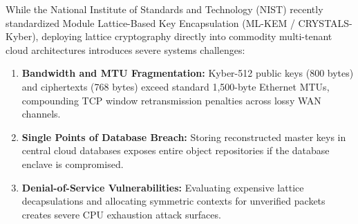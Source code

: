 \documentclass[11pt,a4paper]{article}
\begin{document}
While the National Institute of Standards and Technology (NIST) recently standardized Module Lattice-Based Key Encapsulation (ML-KEM / CRYSTALS-Kyber), deploying lattice cryptography directly into commodity multi-tenant cloud architectures introduces severe systems challenges:
\begin{enumerate}
    \item \textbf{Bandwidth and MTU Fragmentation:} Kyber-512 public keys (800 bytes) and ciphertexts (768 bytes) exceed standard 1,500-byte Ethernet MTUs, compounding TCP window retransmission penalties across lossy WAN channels.
    \item \textbf{Single Points of Database Breach:} Storing reconstructed master keys in central cloud databases exposes entire object repositories if the database enclave is compromised.
    \item \textbf{Denial-of-Service Vulnerabilities:} Evaluating expensive lattice decapsulations and allocating symmetric contexts for unverified packets creates severe CPU exhaustion attack surfaces.
\end{enumerate}
\end{document}

